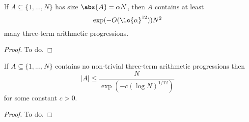 \begin{theorem}\label{main-int-count}
If $A\subseteq \{1,\ldots,N\}$ has size $\abs{A}=\alpha N$, then $A$ contains at least
\[\exp(-O(\lo{\alpha}^{12}))N^2\]
many three-term arithmetic progressions.
\end{theorem}
\begin{proof}
To do.
\end{proof}

\begin{theorem}\label{3aps-in-ints}
If $A\subseteq \{1,\ldots,N\}$ contains no non-trivial three-term arithmetic progressions then
\[\lvert A\rvert \leq \frac{N}{\exp(-c(\log N)^{1/12})}\]
for some constant $c>0$.
\end{theorem}
\begin{proof}
To do.
\end{proof}
